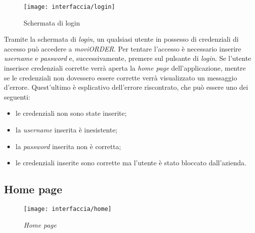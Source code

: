 \begin{figure}[!h] 
    \centering 
    \texttt{[image: interfaccia/login]} 
    \caption{Schermata di login}
\end{figure}

Tramite la schermata di \textit{login}, un qualsiasi utente in possesso di credenziali di accesso può accedere a \textit{moviORDER}. Per tentare l'accesso è necessario inserire \textit{username} e \textit{password} e, successivamente, premere sul pulsante di \textit{login}. Se l'utente inserisce credenziali corrette verrà aperta la \textit{home page} dell'applicazione, mentre se le credenziali non dovessero essere corrette verrà visualizzato un messaggio d'errore. Quest'ultimo è esplicativo dell'errore riscontrato, che può essere uno dei seguenti:
\begin{itemize}
	\item le credenziali non sono state inserite;
	\item la \textit{username} inserita è inesistente;
	\item la \textit{password} inserita non è corretta;
	\item le credenziali inserite sono corrette ma l'utente è stato bloccato dall'azienda.
\end{itemize}

\subsection{Home page}

\begin{figure}[!h] 
    \centering 
    \texttt{[image: interfaccia/home]} 
    \caption{\textit{Home page}}
\end{figure}

